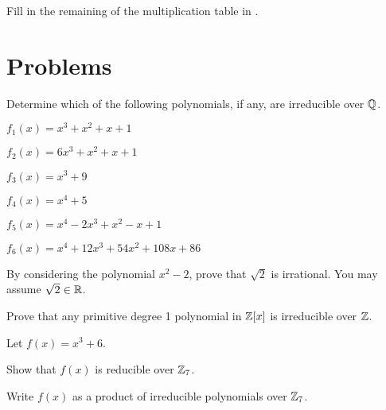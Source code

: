 \begin{exercise}\label{exercise-fill-in-missing-elements-in-table-of-Z3/<x^2+1>}
    Fill in the remaining of the multiplication table in .
\end{exercise}

\newpage

\section{Problems}
\begin{problem}
    Determine which of the following polynomials, if any, are irreducible over $\mathbb{Q}$.
    \begin{multicols}{2}
        \begin{partquestions}{\alph*}
            \item $f_1(x) = x^3 + x^2 + x + 1$
            \item $f_2(x) = 6x^3 + x^2 + x + 1$
            \item $f_3(x) = x^3 + 9$
            \item $f_4(x) = x^4 + 5$
            \item $f_5(x) = x^4 - 2x^3 + x^2 - x + 1$
            \item $f_6(x) = x^4 + 12x^3 + 54x^2 + 108x + 86$
        \end{partquestions}
    \end{multicols}
\end{problem}

\begin{problem}
    By considering the polynomial $x^2 - 2$, prove that $\sqrt2$ is irrational. You may assume $\sqrt2 \in \mathbb{R}$.
\end{problem}

\begin{problem}\label{problem-primitive-degree-1-polynomial-in-Z[x]-is-irreducible}
    Prove that any primitive degree 1 polynomial in $\mathbb{Z}[x]$ is irreducible over $\mathbb{Z}$.
\end{problem}

\begin{problem}
    Let $f(x) = x^3 + 6$.
    \begin{partquestions}{\roman*}
        \item Show that $f(x)$ is reducible over $\mathbb{Z}_7$.
        \item Write $f(x)$ as a product of irreducible polynomials over $\mathbb{Z}_7$.
    \end{partquestions}
\end{problem}


